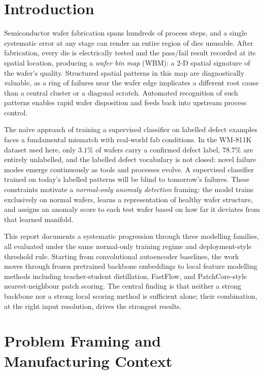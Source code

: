 \documentclass[11pt]{article}
\begin{document}
\newpage
\tableofcontents
\newpage


\section{Introduction}

Semiconductor wafer fabrication spans hundreds of process steps, and a single
systematic error at any stage can render an entire region of dies unusable.
After fabrication, every die is electrically tested and the pass/fail result
recorded at its spatial location, producing a \emph{wafer bin map} (WBM): a
2-D spatial signature of the wafer's quality. Structured spatial patterns in
this map are diagnostically valuable, as a ring of failures near the wafer
edge implicates a different root cause than a central cluster or a diagonal
scratch. Automated recognition of such patterns enables rapid wafer disposition
and feeds back into upstream process control.

The na\"{i}ve approach of training a supervised classifier on labelled defect
examples faces a fundamental mismatch with real-world fab conditions. In the
WM-811K dataset used here, only $3.1\%$ of wafers carry a confirmed defect
label, $78.7\%$ are entirely unlabelled, and the labelled defect vocabulary
is not closed: novel failure modes emerge continuously as tools and processes
evolve. A supervised classifier trained on today's labelled patterns will be
blind to tomorrow's failures. These constraints motivate a \emph{normal-only
anomaly detection} framing: the model trains exclusively on normal wafers,
learns a representation of healthy wafer structure, and assigns an anomaly
score to each test wafer based on how far it deviates from that learned manifold.

This report documents a systematic progression through three modelling families,
all evaluated under the same normal-only training regime and deployment-style
threshold rule. Starting from convolutional autoencoder baselines, the work
moves through frozen pretrained backbone embeddings to local feature modelling
methods including teacher-student distillation, FastFlow, and PatchCore-style
nearest-neighbour patch scoring. The central finding is that neither a strong
backbone nor a strong local scoring method is sufficient alone; their combination,
at the right input resolution, drives the strongest results.

\section{Problem Framing and Manufacturing Context}
\end{document}

